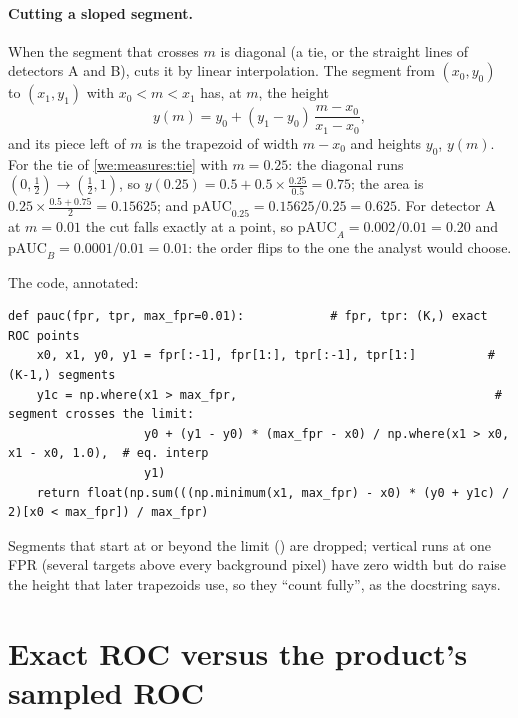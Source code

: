 \paragraph{Cutting a sloped segment.} When the segment that crosses $m$ is diagonal (a tie, or the straight lines of
detectors A and B),  cuts it by linear interpolation. The segment from $(x_0, y_0)$ to $(x_1, y_1)$ with
$x_0 < m < x_1$ has, at $m$, the height
\begin{equation}\label{eq:measures:interp}
y(m) = y_0 + (y_1 - y_0)\,\frac{m - x_0}{x_1 - x_0},
\end{equation}
and its piece left of $m$ is the trapezoid of width $m - x_0$ and heights $y_0$, $y(m)$. For the tie of
\cref{we:measures:tie} with $m = 0.25$: the diagonal runs $(0, \frac12) \to (\frac12, 1)$, so
$y(0.25) = 0.5 + 0.5 \times \frac{0.25}{0.5} = 0.75$; the area is $0.25 \times \frac{0.5 + 0.75}{2} = 0.15625$; and
$\mathrm{pAUC}_{0.25} = 0.15625 / 0.25 = 0.625$. For detector A at $m = 0.01$ the cut falls exactly at a point, so
$\mathrm{pAUC}_A = 0.002 / 0.01 = 0.20$ and $\mathrm{pAUC}_B = 0.0001 / 0.01 = 0.01$: the order flips to the one the
analyst would choose.

The code, annotated:
\begin{lstlisting}[basicstyle=\ttfamily\footnotesize]
def pauc(fpr, tpr, max_fpr=0.01):            # fpr, tpr: (K,) exact ROC points
    x0, x1, y0, y1 = fpr[:-1], fpr[1:], tpr[:-1], tpr[1:]          # (K-1,) segments
    y1c = np.where(x1 > max_fpr,                                    # segment crosses the limit:
                   y0 + (y1 - y0) * (max_fpr - x0) / np.where(x1 > x0, x1 - x0, 1.0),  # eq. interp
                   y1)
    return float(np.sum(((np.minimum(x1, max_fpr) - x0) * (y0 + y1c) / 2)[x0 < max_fpr]) / max_fpr)
\end{lstlisting}
Segments that start at or beyond the limit () are dropped; vertical runs at one FPR (several
targets above every background pixel) have zero width but do raise the height that later trapezoids use, so they
``count fully'', as the docstring says.

\section{Exact ROC versus the product's sampled ROC}\label{sec:measures:exact}

